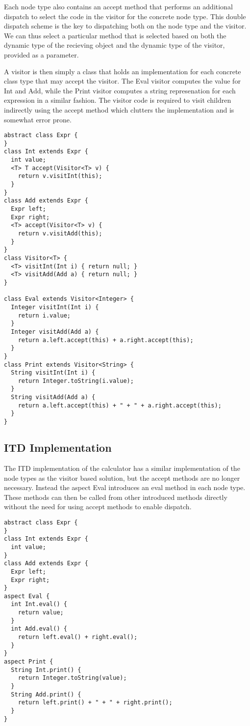 Each node type also contains an accept method that performs an additional
dispatch to select the code in the visitor for the concrete node type. 
This double dispatch scheme is the key to dispatching both on the node 
type and the visitor. We can thus select a particular method that is
selected based on both the dynamic type of the recieving object and the 
dynamic type of the visitor, provided as a parameter. 

A visitor is then simply a class that holds an implementation for each concrete 
class type that may accept the visitor. The Eval visitor computes the 
value for Int and Add, while the Print visitor computes a string 
represenation for each expression in a similar fashion. The visitor code 
is required to visit children indirectly using the accept method which 
clutters the implementation and is somewhat error prone.

\begin{lstlisting}[caption={Visitor Base}]
abstract class Expr {
}
class Int extends Expr {
  int value;
  <T> T accept(Visitor<T> v) {
    return v.visitInt(this);
  }
}
class Add extends Expr {
  Expr left;
  Expr right;
  <T> accept(Visitor<T> v) {
    return v.visitAdd(this);
  }
}
class Visitor<T> {
  <T> visitInt(Int i) { return null; }
  <T> visitAdd(Add a) { return null; }
}

class Eval extends Visitor<Integer> {
  Integer visitInt(Int i) {
    return i.value;
  }
  Integer visitAdd(Add a) {
    return a.left.accept(this) + a.right.accept(this);
  }
}
class Print extends Visitor<String> {
  String visitInt(Int i) {
    return Integer.toString(i.value);
  }
  String visitAdd(Add a) {
    return a.left.accept(this) + " + " + a.right.accept(this);
  }
}
\end{lstlisting}

\subsection{ITD Implementation}
The ITD implementation of the calculator has a similar implementation of the
node types as the visitor based solution, but the accept methods are no
longer necessary. Instead the aspect Eval introduces an eval method in each
node type. These methods can then be called from other introduced methods
directly without the need for using accept methods to enable dispatch.

\begin{lstlisting}[caption={ITD Base}]
abstract class Expr {
}
class Int extends Expr {
  int value;
}
class Add extends Expr {
  Expr left;
  Expr right;
}
aspect Eval {
  int Int.eval() {
    return value;
  }
  int Add.eval() {
    return left.eval() + right.eval();
  }
}
aspect Print {
  String Int.print() {
    return Integer.toString(value);
  }
  String Add.print() {
    return left.print() + " + " + right.print();
  }
}
\end{lstlisting}

